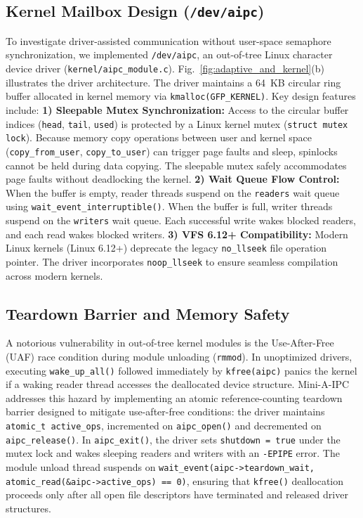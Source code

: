 \subsection{Kernel Mailbox Design (\texttt{/dev/aipc})}
To investigate driver-assisted communication without user-space semaphore synchronization, we implemented \texttt{/dev/aipc}, an out-of-tree Linux character device driver (\texttt{kernel/aipc\_module.c}). Fig.~\ref{fig:adaptive_and_kernel}(b) illustrates the driver architecture.
The driver maintains a 64~KB circular ring buffer allocated in kernel memory via \texttt{kmalloc(GFP\_KERNEL)}. Key design features include:
\textbf{1) Sleepable Mutex Synchronization:} Access to the circular buffer indices (\texttt{head}, \texttt{tail}, \texttt{used}) is protected by a Linux kernel mutex (\texttt{struct mutex lock}). Because memory copy operations between user and kernel space (\texttt{copy\_from\_user}, \texttt{copy\_to\_user}) can trigger page faults and sleep, spinlocks cannot be held during data copying. The sleepable mutex safely accommodates page faults without deadlocking the kernel.
\textbf{2) Wait Queue Flow Control:} When the buffer is empty, reader threads suspend on the \texttt{readers} wait queue using \texttt{wait\_event\_interruptible()}. When the buffer is full, writer threads suspend on the \texttt{writers} wait queue. Each successful write wakes blocked readers, and each read wakes blocked writers.
\textbf{3) VFS 6.12+ Compatibility:} Modern Linux kernels (Linux 6.12+) deprecate the legacy \texttt{no\_llseek} file operation pointer. The driver incorporates \texttt{noop\_llseek} to ensure seamless compilation across modern kernels.

\subsection{Teardown Barrier and Memory Safety}
A notorious vulnerability in out-of-tree kernel modules is the Use-After-Free (UAF) race condition during module unloading (\texttt{rmmod}). In unoptimized drivers, executing \texttt{wake\_up\_all()} followed immediately by \texttt{kfree(aipc)} panics the kernel if a waking reader thread accesses the deallocated device structure.
Mini-A-IPC addresses this hazard by implementing an atomic reference-counting teardown barrier designed to mitigate use-after-free conditions: the driver maintains \texttt{atomic\_t active\_ops}, incremented on \texttt{aipc\_open()} and decremented on \texttt{aipc\_release()}. In \texttt{aipc\_exit()}, the driver sets \texttt{shutdown = true} under the mutex lock and wakes sleeping readers and writers with an \texttt{-EPIPE} error. The module unload thread suspends on \texttt{wait\_event(aipc->teardown\_wait, atomic\_read(\&aipc->active\_ops) == 0)}, ensuring that \texttt{kfree()} deallocation proceeds only after all open file descriptors have terminated and released driver structures.
